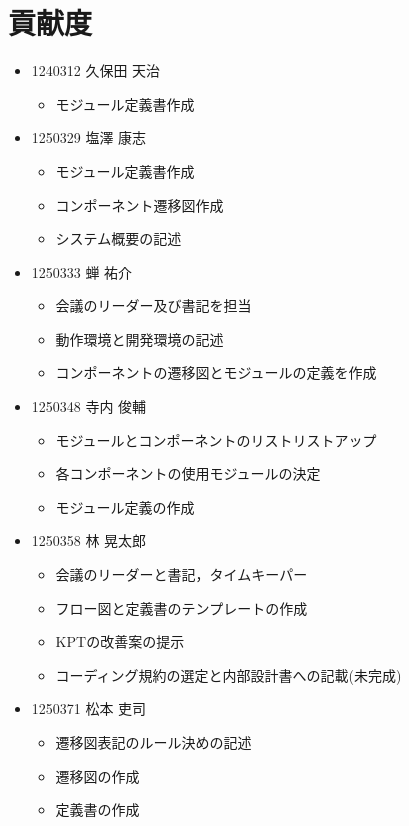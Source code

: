 \documentclass[a4paper, titlepage]{jsarticle}
\begin{document}
\section{貢献度}
\begin{itemize}
\item 1240312 久保田 天治
  \begin{itemize}
  \item モジュール定義書作成
  \end{itemize}

\item 1250329 塩澤 康志
  \begin{itemize}
  \item モジュール定義書作成
  \item コンポーネント遷移図作成
  \item システム概要の記述
  \end{itemize}

\item 1250333 蝉 祐介
  \begin{itemize}
  \item 会議のリーダー及び書記を担当
  \item 動作環境と開発環境の記述
  \item コンポーネントの遷移図とモジュールの定義を作成
  \end{itemize}

\item 1250348 寺内 俊輔
  \begin{itemize}
  \item モジュールとコンポーネントのリストリストアップ
  \item 各コンポーネントの使用モジュールの決定
  \item モジュール定義の作成
  \end{itemize}

\item 1250358 林 晃太郎
  \begin{itemize}
  \item 会議のリーダーと書記，タイムキーパー
  \item フロー図と定義書のテンプレートの作成
  \item KPTの改善案の提示
  \item コーディング規約の選定と内部設計書への記載(未完成)
  \end{itemize}

\item 1250371 松本 吏司
  \begin{itemize}
  \item 遷移図表記のルール決めの記述
  \item 遷移図の作成
  \item 定義書の作成
  \end{itemize}
\end{itemize}
\end{document}

